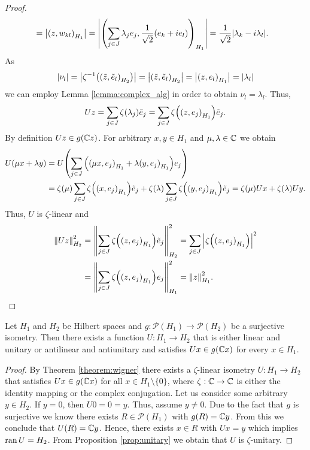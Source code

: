 \begin{proof}
\begin{align*}
		&= \vbraces{\pbraces{z, w_{kl}}_{H_1}} = \vbraces{\pbraces{\sum_{j \in J} \lambda_j e_j, \frac{1}{\sqrt{2}}(e_k + ie_l)}_{H_1}} = \frac{1}{\sqrt{2}} \vbraces{\lambda_k - i \lambda_l}.
	\end{align*}
	As
	\begin{align*}
		\vbraces{\nu_l} = \vbraces{\zeta^{-1}\pbraces{\pbraces{\tilde{z}, \tilde{e}_l}_{H_2}}} = \vbraces{\pbraces{\tilde{z}, \tilde{e}_l}_{H_2}} = \vbraces{\pbraces{z, e_l}_{H_1}} = \vbraces{\lambda_l}
	\end{align*}
	we can employ Lemma \ref{lemma:complex_alg} in order to obtain $\nu_l = \lambda_l$. Thus, 
	\begin{align*}
		Uz = \sum_{j \in J} \zeta(\lambda_j) \tilde{e}_j = \sum_{j \in J} \zeta\pbraces{\pbraces{z, e_j}_{H_1}}\tilde{e}_j.
	\end{align*}
	By definition $Uz \in g(\C z)$. For arbitrary $x,y \in H_1$ and $\mu, \lambda \in \C$ we obtain
	\begin{align*}
		U(\mu x + \lambda y) &= U \pbraces{\sum_{j \in J} \pbraces{\pbraces{\mu x, e_j}_{H_1} + \lambda \pbraces{y, e_j}_{H_1}} e_j} \\
		&= \zeta(\mu) \sum_{j \in J} \zeta\pbraces{\pbraces{x, e_j}_{H_1}} \tilde{e}_j + \zeta(\lambda) \sum_{j \in J} \zeta\pbraces{\pbraces{y, e_j}_{H_1}} \tilde{e}_j = \zeta(\mu) Ux + \zeta\pbraces{\lambda} Uy.
	\end{align*}
	Thus, $U$ is $\zeta$-linear and 
	\begin{align*}
		\norm[H_2]{Uz}^2 &= \norm[H_2]{\sum_{j \in J} \zeta\pbraces{\pbraces{z, e_j}_{H_1}} \tilde{e}_j}^2 = \sum_{j \in J} \vbraces{\zeta\pbraces{\pbraces{z, e_j}_{H_1}}}^2  \\
		&= \norm[H_1]{\sum_{j \in J} \zeta\pbraces{\pbraces{z, e_j}_{H_1}} e_j}^2 = \norm[H_1]{z}^2.
	\end{align*}
\end{proof}


\begin{corollary}
	Let $H_1$ and $H_2$ be Hilbert spaces and $g: \mathcal{P}(H_1) \to \mathcal{P}(H_2)$ be a surjective isometry. Then there exists a function $U: H_1 \to H_2$ that is either linear and unitary or antilinear and antiunitary and satisfies $Ux \in g(\C x)$ for every $x \in H_1$.
\end{corollary}

\begin{proof}
	By Theorem \ref{theorem:wigner} there exists a $\zeta$-linear isometry $U: H_1 \to H_2$ that satisfies $Ux \in g\pbraces{\C x}$ for all $x \in H_1 \setminus \{0\}$, where $\zeta:\C \to \C$ is either the identity mapping or the complex conjugation. 
	Let us consider some arbitrary $y \in H_2$. If $y = 0$, then $U0 = 0 = y$. Thus, assume $y \neq 0$. Due to the fact that $g$ is surjective we know there exists $R \in \mathcal{P}(H_1)$ with $g(R) = \C y$. From this we conclude that $U(R) = \C y$. Hence, there exists $x \in R$ with $Ux = y$ which implies $\ran U = H_2$. From Proposition \ref{prop:unitary} we obtain that $U$ is $\zeta$-unitary.
\end{proof}